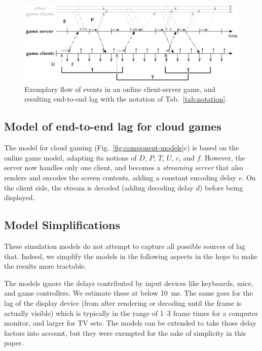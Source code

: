 \begin{figure}[!t]
	\centering
	\includegraphics[width=1.0\columnwidth]{../../models/tickrate-timeseries-notation.pdf}
	\caption{Exemplary flow of events in an online client-server game, and resulting end-to-end lag with the notation of Tab.~\ref{tab:notation}.
	} %
\label{fig:tickrate-timeseries}
\end{figure}



\subsection{Model of end-to-end lag for cloud games}
The model for cloud gaming (Fig.~\ref{fig:component-models}c) is based on the online game model, adapting its notions of $D$, $P$, $T$, $U$, $c$, and $f$. However, the server now handles only one client, and becomes a \textit{streaming server} that also renders and encodes the screen contents, adding a constant encoding delay $e$. On the client side, the stream is decoded (adding decoding delay $d$) before being displayed.



\subsection{Model Simplifications}

These simulation models do not attempt to capture all possible sources of lag that. Indeed, we simplify the models in the following aspects in the hope to make the results more tractable.

The models ignore the delays contributed by input devices like keyboards, mice, and game controllers. We estimate these at below \SI{10}{\milli\second}. The same goes for the lag of the display device (from after rendering or decoding until the frame is actually visible) which is typically in the range of 1--3 frame times for a computer monitor, and larger for TV sets. The models can be extended to take those delay factors into account, but they were exempted for the sake of simplicity in this paper.

